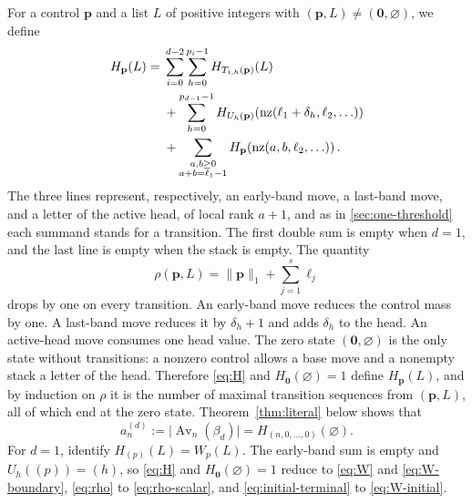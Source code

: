 \documentclass[11pt,reqno]{amsart}
\theoremstyle{definition}
\theoremstyle{remark}
\newcommand{\Av}{\operatorname{Av}}
\newcommand{\nz}{\operatorname{nz}}
\begin{document}
For a control $\mathbf p$ and a list $L$ of positive integers with
$(\mathbf p,L)\ne(\mathbf0,\varnothing)$, we define
\begin{align}
H_{\mathbf p}(L)={}&
 \sum_{i=0}^{d-2}\sum_{h=0}^{p_i-1}
 H_{T_{i,h}(\mathbf p)}(L)                                           \label{eq:H}\\
&+\sum_{h=0}^{p_{d-1}-1}
 H_{U_h(\mathbf p)}\!\left(
   \nz(\ell_1+\delta_h,\ell_2,\ldots)\right)                       \notag\\
&+\sum_{\substack{a,b\geq0\\a+b=\ell_1-1}}
 H_{\mathbf p}\!\left(\nz(a,b,\ell_2,\ldots)\right).                \notag
\end{align}
The three lines represent, respectively, an early-band move, a last-band
move, and a letter of the active head, of local rank $a+1$, and as in
\cref{sec:one-threshold} each summand stands for a transition.  The first
double sum is empty when $d=1$, and the last line is empty when the stack
is empty.  The quantity
\begin{equation}\label{eq:rho}
 \rho(\mathbf p,L)=\|\mathbf p\|_1+\sum_{j=1}^{s}\ell_j
\end{equation}
drops by one on every transition.  An early-band move reduces the control
mass by one.  A last-band move reduces it by $\delta_h+1$ and adds
$\delta_h$ to the head.  An active-head move consumes one head value.
The zero state $(\mathbf0,\varnothing)$ is the only state without
transitions: a nonzero control allows a base move and a nonempty stack a
letter of the head.  Therefore \eqref{eq:H} and $H_{\mathbf0}(\varnothing)=1$ define
$H_{\mathbf p}(L)$, and by induction on $\rho$ it is the number of maximal
transition sequences from $(\mathbf p,L)$, all of which end at the zero
state.  Theorem~\ref{thm:literal} below shows that
\begin{equation}\label{eq:initial-terminal}
 a_n^{(d)}:=\lvert\Av_n(\beta_d)\rvert
 =H_{(n,0,\ldots,0)}(\varnothing).
\end{equation}
For $d=1$, identify $H_{(p)}(L)=W_p(L)$.  The early-band sum is empty and
$U_h((p))=(h)$, so \eqref{eq:H} and $H_{\mathbf0}(\varnothing)=1$ reduce to
\eqref{eq:W} and \eqref{eq:W-boundary}, \eqref{eq:rho} to
\eqref{eq:rho-scalar}, and \eqref{eq:initial-terminal} to
\eqref{eq:W-initial}.
\end{document}
